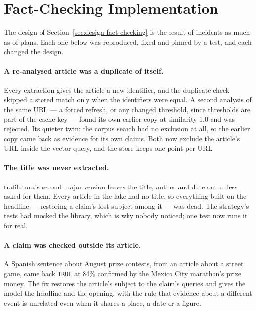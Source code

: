 
\section{Fact-Checking Implementation}
\label{sec:dev-fact-checking}

The design of Section~\ref{sec:design-fact-checking} is the result of
incidents as much as of plans. Each one below was reproduced, fixed and
pinned by a test, and each changed the design.

\paragraph{A re-analysed article was a duplicate of itself.} Every
extraction gives the article a new identifier, and the duplicate check
skipped a stored match only when the identifiers were equal. A second
analysis of the same URL --- a forced refresh, or any changed
threshold, since thresholds are part of the cache key --- found its own
earlier copy at similarity 1.0 and was rejected. Its quieter twin: the
corpus search had no exclusion at all, so the earlier copy came back as
evidence for its own claims. Both now exclude the article's URL inside
the vector query, and the store keeps one point per URL.

\paragraph{The title was never extracted.} trafilatura's second major
version leaves the title, author and date out unless asked for them.
Every article in the lake had no title, so everything built on the
headline --- restoring a claim's lost subject among it --- was dead. The
strategy's tests had mocked the library, which is why nobody noticed;
one test now runs it for real.

\paragraph{A claim was checked outside its article.} A Spanish sentence
about August prize contests, from an article about a street game, came
back \texttt{TRUE} at 84\% confirmed by the Mexico City marathon's prize
money. The fix restores the article's subject to the claim's queries
and gives the model the headline and the opening, with the rule that
evidence about a different event is unrelated even when it shares a
place, a date or a figure.

